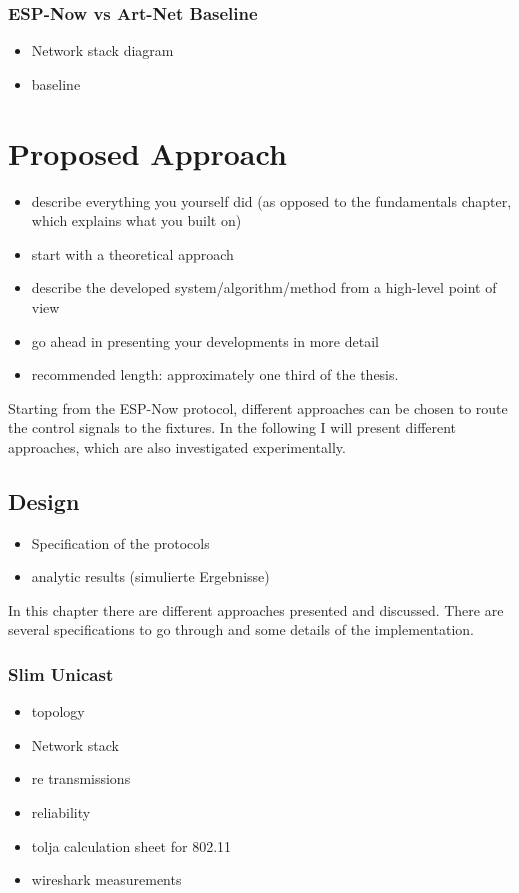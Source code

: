\documentclass[]{ccs-thesis}
\begin{document}
\subsection*{ESP-Now vs Art-Net Baseline}
\begin{itemize}
\item Network stack diagram
\item baseline
\end{itemize}

\chapter{Proposed Approach}
\begin{itemize}
\item describe everything you yourself did (as opposed to the fundamentals chapter, which explains what you built on)
\item start with a theoretical approach
\item describe the developed system/algorithm/method from a high-level point of view
\item go ahead in presenting your developments in more detail
\item recommended length: approximately one third of the thesis.
\end{itemize}

Starting from the ESP-Now protocol, different approaches can be chosen to route the control signals to the fixtures. 
In the following I will present different approaches, which are also investigated experimentally.

\section{Design}
\label{sec:cross-reff}
\begin{itemize}
	\item Specification of the protocols
	\item analytic results (simulierte Ergebnisse)
\end{itemize}

In this chapter there are different approaches presented and discussed.
There are several specifications to go through and some details of the implementation.

\subsection*{Slim Unicast}
\begin{itemize}
\item topology
\item Network stack
\item re transmissions
\item reliability
\item tolja calculation sheet for 802.11
\item wireshark measurements
\end{itemize}
\end{document}
